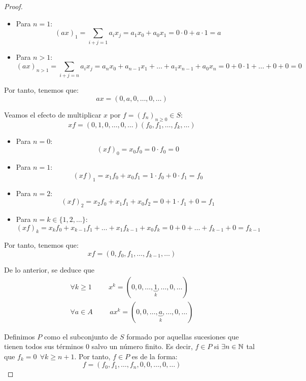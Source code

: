 \begin{proof}
\begin{itemize}
        \item Para $n=1$:
        $$(ax)_1 = \sum_{i+j=1} a_i x_j = a_1 x_0 + a_0 x_1 = 0 \cdot 0 + a \cdot 1 = a$$

        \item Para $n>1$:
        $$(ax)_{n > 1} = \sum_{i+j=n} a_i x_j = a_n x_0 + a_{n-1} x_1 + \ldots + a_1 x_{n-1} + a_0 x_n = 0 + 0 \cdot 1 + \ldots + 0+0 = 0$$
    \end{itemize}

    Por tanto, tenemos que:
    $$ax = (0, a, 0, \ldots, 0, \ldots)$$
    
    Veamos el efecto de multiplicar $x$ por $f=(f_n)_{n\geq 0} \in S$:
    $$xf = (0, 1, 0, \ldots, 0, \ldots) (f_0, f_1, \ldots, f_k, \ldots)$$
    \begin{itemize}
        \item Para $n=0$:
        $$(xf)_0 = x_0 f_0 = 0 \cdot f_0 = 0$$
        
        \item Para $n=1$:
        $$(xf)_1 = x_1 f_0 + x_0 f_1 = 1 \cdot f_0 + 0 \cdot f_1 = f_0$$
        
        \item Para $n=2$:
        $$(xf)_2 = x_2 f_0 + x_1 f_1 + x_0 f_2 = 0 + 1 \cdot f_1 + 0 = f_1$$

        \item Para $n=k\in \{1,2,\dots\}$:
        $$(xf)_k = x_k f_0 + x_{k-1} f_1 + \ldots + x_1 f_{k-1} + x_0 f_k = 0 + 0 + \ldots + f_{k-1} + 0 = f_{k-1}$$
    \end{itemize}
    
    Por tanto, tenemos que:
    $$xf = (0, f_0, f_1, \ldots, f_{k-1}, \ldots)$$

    De lo anterior, se deduce que
    \begin{gather*}
        \forall k \geq 1 \hspace{1cm} x^k = (0, 0, \ldots, \underbrace{1}_k, \ldots, 0, \ldots)\\
        \forall a \in A \hspace{1cm} ax^k = (0, 0, \ldots, \underbrace{a}_k, \ldots, 0, \ldots)
    \end{gather*}
    
    Definimos $P$ como el subconjunto de $S$ formado por aquellas sucesiones que tienen todos sus términos 0 salvo un número finito. Es decir, $f \in P$ si $\exists n \in \mathbb N$ tal que $f_k = 0~~\forall k \geq n+1$. Por tanto, $f \in P$ es de la forma:
    $$f = (f_0, f_1, \ldots, f_n, 0, 0, \ldots, 0, \ldots)$$


\end{proof}
